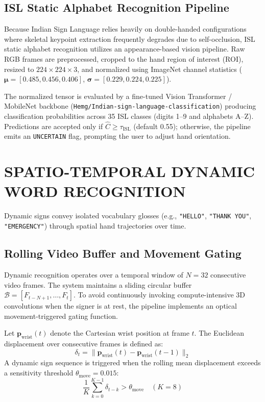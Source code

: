 \documentclass[12pt,a4paper]{report}
\begin{document}
\subsection{ISL Static Alphabet Recognition Pipeline}
Because Indian Sign Language relies heavily on double-handed configurations where skeletal keypoint extraction frequently degrades due to self-occlusion, ISL static alphabet recognition utilizes an appearance-based vision pipeline. Raw RGB frames are preprocessed, cropped to the hand region of interest (ROI), resized to $224 \times 224 \times 3$, and normalized using ImageNet channel statistics ($\boldsymbol{\mu} = [0.485, 0.456, 0.406]$, $\boldsymbol{\sigma} = [0.229, 0.224, 0.225]$).

The normalized tensor is evaluated by a fine-tuned Vision Transformer / MobileNet backbone (\texttt{Hemg/Indian-sign-language-classification}) producing classification probabilities across 35 ISL classes (digits 1--9 and alphabets A--Z). Predictions are accepted only if $\hat{C} \ge \tau_{\text{ISL}}$ (default 0.55); otherwise, the pipeline emits an \texttt{UNCERTAIN} flag, prompting the user to adjust hand orientation.

\section{SPATIO-TEMPORAL DYNAMIC WORD RECOGNITION} \label{sec:impl-dynamic}
Dynamic signs convey isolated vocabulary glosses (e.g., \texttt{"HELLO"}, \texttt{"THANK YOU"}, \texttt{"EMERGENCY"}) through spatial hand trajectories over time.

\subsection{Rolling Video Buffer and Movement Gating}
Dynamic recognition operates over a temporal window of $N=32$ consecutive video frames. The system maintains a sliding circular buffer $\mathcal{B} = [F_{t-N+1}, \dots, F_t]$. To avoid continuously invoking compute-intensive 3D convolutions when the signer is at rest, the pipeline implements an optical movement-triggered gating function.

Let $\mathbf{p}_{\text{wrist}}(t)$ denote the Cartesian wrist position at frame $t$. The Euclidean displacement over consecutive frames is defined as:
\begin{equation}
\delta_t = \|\mathbf{p}_{\text{wrist}}(t) - \mathbf{p}_{\text{wrist}}(t-1)\|_2
\end{equation}
A dynamic sign sequence is triggered when the rolling mean displacement exceeds a sensitivity threshold $\theta_{\text{move}} = 0.015$:
\begin{equation}
\frac{1}{K} \sum_{k=0}^{K-1} \delta_{t-k} > \theta_{\text{move}} \quad (K=8)
\end{equation}
\end{document}
